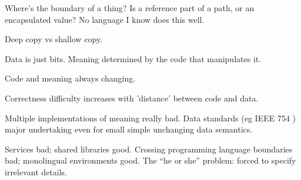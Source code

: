 Where's the boundary of a thing? 
Is a reference part of a path, or
an encapsulated value?
No language I know does this well.

Deep copy vs shallow copy.

Data is just bits. 
Meaning determined by the code that manipulates it. 

Code and meaning always changing.

Correctness difficulty increases
with 'distance' between code and data. 

Multiple implementations of meaning really bad.
Data standards (eg {IEEE} 754 \cite{Higham:2002:ASNA, IEEE:1985:AIS,
P754:2008:ISF, Muller-et-al-2010}) major undertaking even for
small simple unchanging data semantics.

Services bad; shared libraries good.
Crossing programming language boundaries bad; 
monolingual environments \cite{HeeringKlint:1985:Monlingual:TMP:3318.3321} good.
The ``he or she'' problem: forced to specify irrelevant details.
